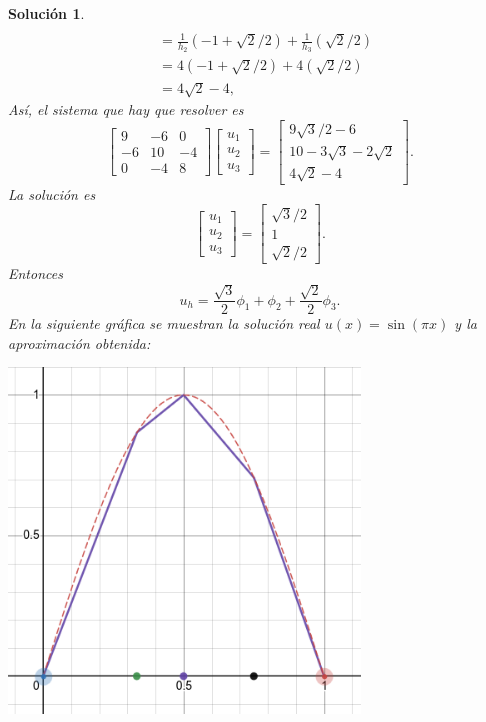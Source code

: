 \documentclass[11pt]{article}
\newtheorem*{sol}{Solución}
\newcommand\<{\langle}
\renewcommand\>{\rangle}
\begin{document}
\begin{sol}
\begin{align}
    \\
      &= 
      \frac{1}{h_{2}}
      (- 1+ \sqrt 2 / 2)
      +
      \frac{1}{h_{3}}
      (\sqrt 2 / 2 )
    \\
      &= 
      4
      (- 1+ \sqrt 2 / 2)
      +
      4
      (\sqrt 2 / 2 )
    \\
      &= 4\sqrt 2 - 4
  ,\end{align}
  Así, el sistema que hay que resolver es
  \begin{equation}
    \begin{bmatrix}
      9 &-6 &0 \\
      -6 &10 &-4 \\
      0 &-4 &8
    \end{bmatrix}
    \begin{bmatrix}
      u_1 \\ u_2 \\ u_3
    \end{bmatrix}
    =
    \begin{bmatrix}
      9\sqrt{3} / 2 - 6 \\
      10 -3\sqrt 3 -2\sqrt 2 \\
      4\sqrt 2 - 4
    \end{bmatrix}.
  \end{equation}
  La solución es
  \begin{equation}
    \begin{bmatrix}
      u_1 \\ u_2 \\ u_3
    \end{bmatrix}
    =
    \begin{bmatrix}
      \sqrt 3 / 2 \\
      1 \\
      \sqrt 2 / 2
    \end{bmatrix}
  .\end{equation}
  Entonces
  \begin{equation}
    u_h
    =
    \frac{\sqrt 3}{2}\phi_1
    + \phi_2
    + \frac{\sqrt 2}{2}\phi_3
  .\end{equation}
  En la siguiente gráfica se muestran la solución real
  $u(x)=\sin(\pi x)$ y la aproximación obtenida:
  \begin{center}
  \includegraphics[width=0.7\textwidth]{img/sol_vs_aprox}
  \end{center}
\end{sol}
\end{document}
